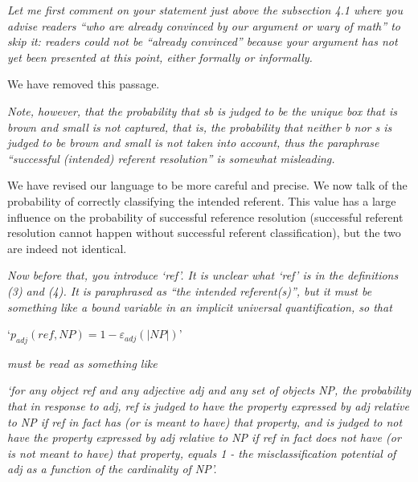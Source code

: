 \documentclass[12pt]{article}
\begin{document}
\item \emph{Let me first comment on your statement just above the subsection 4.1 where
	you advise readers ``who are already convinced by our argument or wary of
	math'' to skip it: readers could not be ``already convinced'' because your
	argument has not yet been presented at this point, either formally or
	informally.}

We have removed this passage.
	
%
	
\item \emph{Note, however, that the probability that sb is judged to be the unique box
	that is brown and small is not captured, that is, the probability that
	neither b nor s is judged to be brown and small is not taken into account,
	thus the paraphrase ``successful (intended) referent resolution'' is somewhat
	misleading.}

We have revised our language to be more careful and precise. We now talk of the probability of correctly classifying the intended referent. This value has a large influence on the probability of successful reference resolution (successful referent resolution cannot happen without successful referent classification), but the two are indeed not identical.
	
\item \emph{Now before that, you introduce `ref'. It is unclear what `ref' is in the
	definitions (3) and (4). It is paraphrased as ``the intended referent(s)'',
	but it must be something like a bound variable in an implicit universal
	quantification, so that} 
	
	`$p_{adj}(ref, NP) = 1 -  \varepsilon_{adj}(|NP|)$'
	
	\emph{must be read as something like}
	
	\emph{`for any object ref and any adjective adj and any set of objects NP, the
	probability that in response to adj, ref is judged to have the property
	expressed by adj relative to NP if ref in fact has (or is meant to have)
	that property, and is judged to not have the property expressed by adj
	relative to NP if ref in fact does not have (or is not meant to have) that
	property, equals 1 - the misclassification potential of adj as a function of
	the cardinality of NP'.}
\end{document}
